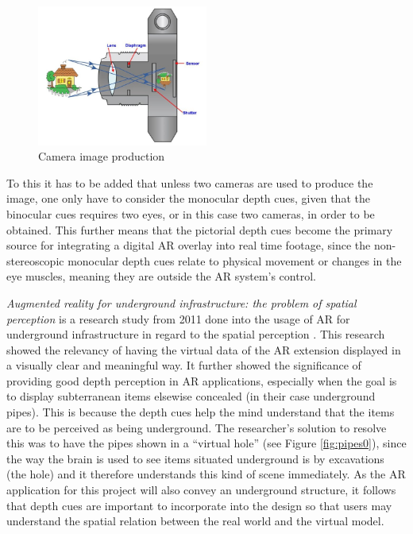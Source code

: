 \begin{figure}[h!]
   \centering
   \includegraphics[width=0.5\textwidth]{figures/camera.jpg}
   \caption{Camera image production \cite{Camera}}\label{fig:camera}
\end{figure}

To this it has to be added that unless two cameras are used to produce the image, one only have to consider the monocular depth cues, given that the binocular cues requires two eyes, or in this case two cameras, in order to be obtained. This further means that the pictorial depth cues become the primary source for integrating a digital AR overlay into real time footage, since the non-stereoscopic monocular depth cues relate to physical movement or changes in the eye muscles, meaning they are outside the AR system’s control.

\textit{Augmented reality for underground infrastructure: the problem of spatial perception} is a research study from 2011 done into the usage of AR for underground infrastructure in regard to the spatial perception \cite{Cote2011}. This research showed the relevancy of having the virtual data of the AR extension displayed in a visually clear and meaningful way. It further showed the significance of providing good depth perception in AR applications, especially when the goal is to display subterranean items elsewise concealed (in their case underground pipes). This is because the depth cues help the mind understand that the items are to be perceived as being underground. The researcher's solution to resolve this was to have the pipes shown in a “virtual hole” (see Figure \ref{fig:pipes0}), since the way the brain is used to see items situated underground is by excavations (the hole) and it therefore understands this kind of scene immediately. As the AR application for this project will also convey an underground structure, it follows that depth cues are important to incorporate into the design so that users may understand the spatial relation between the real world and the virtual model.


